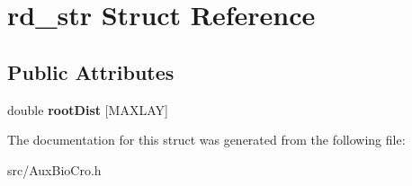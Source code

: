 \hypertarget{structrd__str}{\section{rd\-\_\-str Struct Reference}
\label{structrd__str}
}
\subsection*{Public Attributes}
\begin{DoxyCompactItemize}
\item 
\hypertarget{structrd__str_a72c08ee2378ad2245439d54ff775b4de}{double {\bfseries root\-Dist} \mbox{[}M\-A\-X\-L\-A\-Y\mbox{]}}\label{structrd__str_a72c08ee2378ad2245439d54ff775b4de}

\end{DoxyCompactItemize}


The documentation for this struct was generated from the following file\-:\begin{DoxyCompactItemize}
\item 
src/Aux\-Bio\-Cro.\-h\end{DoxyCompactItemize}
